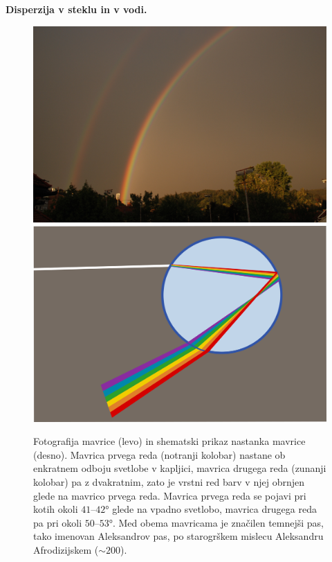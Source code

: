 \begin{example}{\bf Disperzija v steklu in v vodi.}
\begin{figure}[ht]
\centering
\includegraphics[width=7truecm]{slike/09_mavrica_photo.jpg}\hfill
\includegraphics[width=7truecm]{slike/09_mavrica_disp.png}
\caption{Fotografija mavrice (levo) in shematski prikaz nastanka
mavrice (desno). Mavrica prvega reda (notranji kolobar) nastane ob enkratnem
odboju svetlobe v kapljici, mavrica drugega reda (zunanji kolobar) pa z dvakratnim, 
zato je vrstni red barv v njej obrnjen glede na mavrico prvega reda. 
Mavrica prvega reda se pojavi pri 
kotih okoli $41$--$42\si{\degree}$ glede na vpadno svetlobo, mavrica drugega
reda pa pri okoli $50$--$53\si{\degree}$. Med obema mavricama je značilen 
temnejši pas, tako imenovan Aleksandrov pas, po starogrškem mislecu Aleksandru
Afrodizijskem ($\sim 200$).}
\label{fig:09_mavrica}
\end{figure}
\end{example}

